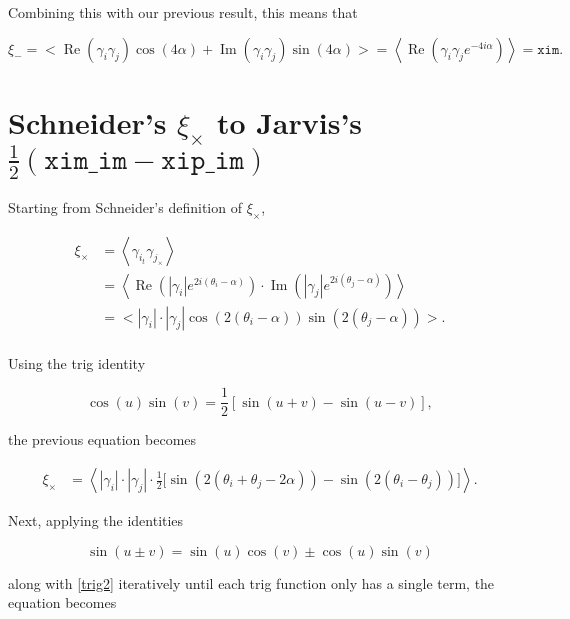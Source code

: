 \documentclass[%
 reprint,
 amsmath,amssymb,
 aps,
]{revtex4-1}
\begin{document}
Combining this with our previous result, this means that

$$\xi_-=\big<\operatorname{Re}(\gamma_i\gamma_j)\cos(4\alpha)+\operatorname{Im}(\gamma_i\gamma_j)\sin(4\alpha)\big>=\left<\operatorname{Re}\left(\gamma_i\gamma_je^{-4i\alpha}\right)\right>=\texttt{xim}.$$

\section*{Schneider's $\xi_\times$ to Jarvis's $\frac{1}{2}\left(\texttt{xim\_im}-\texttt{xip\_im}\right)$}

Starting from Schneider's definition of $\xi_\times$,

\begin{align*}
\xi_\times&=\left<\gamma_{i_t}\gamma_{j_\times}\right>\\
&=\left<\operatorname{Re}\left(|\gamma_i|e^{2i(\theta_i-\alpha)}\right)\cdot\operatorname{Im}\left(|\gamma_j|e^{2i(\theta_j-\alpha)}\right)\right>\\
&=\big<|\gamma_i|\cdot|\gamma_j|\cos\left(2(\theta_i-\alpha)\right)\sin\left(2(\theta_j-\alpha)\right)\big>.\\
\end{align*}

Using the trig identity

\begin{equation}\label{trig3}
\cos(u)\sin(v)=\frac{1}{2}\left[\sin(u+v)-\sin(u-v)\right],
\end{equation}

the previous equation becomes

\begin{align*}
\xi_\times&=\left<|\gamma_i|\cdot|\gamma_j|\cdot\frac{1}{2}\big[\sin\left(2(\theta_i+\theta_j-2\alpha)\right)-\sin\left(2(\theta_i-\theta_j)\right)\big]\right>.
\end{align*}

Next, applying the identities

\begin{equation}\label{trig4}
\sin(u\pm v)=\sin(u)\cos(v)\pm\cos(u)\sin(v)
\end{equation}

along with \eqref{trig2} iteratively until each trig function only has a single term, the equation becomes
\end{document}
